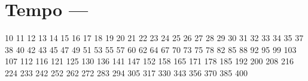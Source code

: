 \section{Tempo --- }
10  
11  
12  
13  
14  
15  
16  
17  
18  
19 
20 
21 
22 
23 
24 
25 
26 
27 
28 
29 
30 
31 
32 
33 
34 
35 
37 
38 
40 
42 
43 
45 
47 
49 
51 
53 
55 
57 
60 
62 
64 
67 
70 
73 
75 
78 
82 
85 
88 
92 
95 
99 
103
107
112
116
121
125
130
136
141
147
152
158
165
171
178
185
192
200
208
216
224
233
242
252
262
272
283
294
305
317
330
343
356
370
385
400
